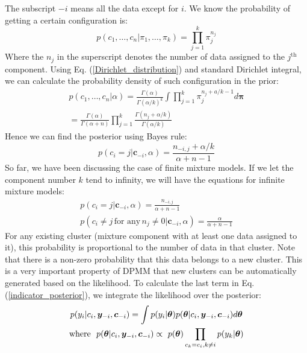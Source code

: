 \documentclass[journal]{IEEEtran}
\begin{document}
%
The subscript $-i$ means all the data except for $i$.
We know the probability of getting a certain configuration is:
\begin{equation}
p(c_1,\dots, c_n|\pi_1, \dots, \pi_k) = \prod_{j=1}^k \pi_j^{n_j}
\label{configuration_probability}
\end{equation}
Where the $n_j$ in the superscript denotes the number of data assigned to the $j^\text{th}$ component.
Using Eq. (\ref{Dirichlet_distribution}) and standard Dirichlet integral, we can calculate the probability density of such configuration in the prior:
\begin{equation}
\begin{gathered}
p(c_1, \dots, c_n | \alpha) =  \frac{\Gamma(\alpha)}
{\Gamma(\alpha / k)^k} \int \prod_{j=1}^k \pi_j^{n_j + a/k - 1} d\bm{\pi}
\\
= \frac{\Gamma(\alpha)}{\Gamma(\alpha + n)} 
\prod_{j=1}^k \frac{\Gamma(n_j + \alpha/k)}{\Gamma(\alpha/k)}
\end{gathered}
\label{indicator_prior}
\end{equation}
Hence we can find the posterior using Bayes rule:
\begin{equation}
p(c_i =j | \bm{c}_{-i} , \alpha) = 
\frac{n_{-i, j} + \alpha /k}{\alpha + n - 1}
\label{indicator_posterior_2}
\end{equation}
%
So far, we have been discussing the case of finite mixture models. If we let the component number $k$ tend to infinity, we will have the equations for infinite mixture models:
\begin{equation}
\begin{gathered}
p(c_i =j | \bm{c}_{-i} , \alpha) = 
\frac{n_{-i, j}}{\alpha + n - 1}
\\
p(c_i \neq j \, \text{for any} \, n_j \neq 0 | \bm{c}_{-i} , \alpha) = 
\frac{\alpha}{\alpha + n - 1}
\end{gathered}
\label{indicator_posterior_3}
\end{equation}
For any existing cluster (mixture component with at least one data assigned to it), this probability is proportional to the number of data in that cluster. 
Note that there is a non-zero probability that this data belongs to a new cluster. 
This is a very important property of DPMM that new clusters can be automatically generated based on the likelihood. 
To calculate the last term in Eq. (\ref{indicator_posterior}), we integrate the likelihood over the posterior:
\begin{equation}
\begin{gathered}
p(y_i|c_i, \bm{y}_{-i}, \bm{c}_{-i}) = 
\int p(y_i|\bm{\theta})
p(\bm{\theta}|c_i, \bm{y}_{-i}, \bm{c}_{-i})
d\bm{\theta}
%
\\
%
\text{where \,\,} 
p(\bm{\theta}|c_i, \bm{y}_{-i}, \bm{c}_{-i}) \propto
\,\, p(\bm{\theta})
\prod_{c_k=c_i, k \neq i} p(y_k|\bm{\theta})
\end{gathered}
\label{integral_1}
\end{equation}
\end{document}
